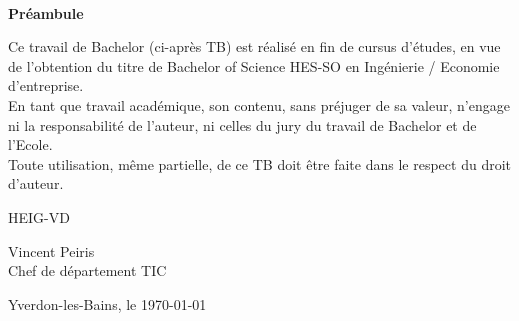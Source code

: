 
\textsc{\Large }\\[3cm]
\begin{center}
    {\huge \bfseries Préambule}
    \vspace{1cm}
\end{center}

\noindent Ce travail de Bachelor (ci-après TB) est réalisé en fin de cursus d’études, en vue de l'obtention du titre de Bachelor of Science HES-SO en {\color{red} Ingénierie / Economie d’entreprise}. \\

\noindent En tant que travail académique, son contenu, sans préjuger de sa valeur, n'engage ni la responsabilité de l'auteur, ni celles du jury du travail de Bachelor et de l'Ecole. \\

\noindent Toute utilisation, même partielle, de ce TB doit être faite dans le respect du droit d’auteur. \\


\begin{flushright}
    \begin{minipage}{7cm}
        \vspace{2cm}
        HEIG-VD \\

        \vspace{2cm}

        Vincent Peiris\\
        Chef de département TIC
    \end{minipage}\hfill
\end{flushright}

\vspace{3cm}

Yverdon-les-Bains, le \today